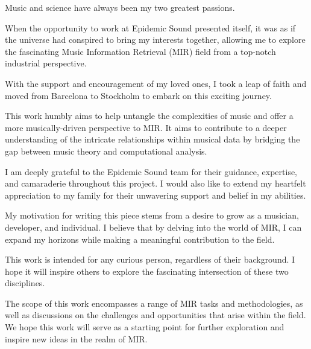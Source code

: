 \begin{preface}

Music and science have always been my two greatest passions. 

When the opportunity to work at Epidemic Sound presented itself, it was as if the universe had conspired to bring my interests together, allowing me to explore the fascinating Music Information Retrieval (MIR) field from a top-notch industrial perspective. 

With the support and encouragement of my loved ones, I took a leap of faith and moved from Barcelona to Stockholm to embark on this exciting journey.

This work humbly aims to help untangle the complexities of music and offer a more musically-driven perspective to MIR. It aims to contribute to a deeper understanding of the intricate relationships within musical data by bridging the gap between music theory and computational analysis.

I am deeply grateful to the Epidemic Sound team for their guidance, expertise, and camaraderie throughout this project. I would also like to extend my heartfelt appreciation to my family for their unwavering support and belief in my abilities.

My motivation for writing this piece stems from a desire to grow as a musician, developer, and individual. I believe that by delving into the world of MIR, I can expand my horizons while making a meaningful contribution to the field.

This work is intended for any curious person, regardless of their background. I hope it will inspire others to explore the fascinating intersection of these two disciplines.

The scope of this work encompasses a range of MIR tasks and methodologies, as well as discussions on the challenges and opportunities that arise within the field. We hope this work will serve as a starting point for further exploration and inspire new ideas in the realm of MIR.

\newpage
\end{preface}
